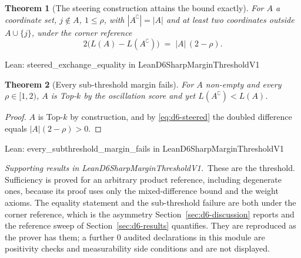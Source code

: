 \documentclass[conference]{IEEEtran}
\newtheorem{theorem}{Theorem}
\theoremstyle{definition}
\newcommand{\lean}[1]{\textsf{\footnotesize #1}}
\newcommand{\leanbox}[1]{%
  \par\vspace{2pt}\noindent
  {\footnotesize\textsf{Lean: #1}}\par\vspace{2pt}}
\begin{document}
\begin{theorem}[The steering construction attains the bound exactly]
\label{thm:d6-steered}
For $A$ a coordinate set, $j\notin A$, $1\le\rho$, with $|A^{\complement}|=|A|$ and at least
two coordinates outside $A\cup\{j\}$, under the corner reference
\begin{equation}
2\bigl(L(A)-L(A^{\complement})\bigr)\;=\;|A|\,(2-\rho).
\label{eq:d6-steered}
\end{equation}
\end{theorem}

\leanbox{\lean{steered\_exchange\_equality} in \lean{LeanD6SharpMarginThresholdV1}}

\begin{theorem}[Every sub-threshold margin fails]
\label{thm:d6-subthreshold}
For $A$ non-empty and every $\rho\in[1,2)$, $A$ is Top-$k$ by the oscillation score and yet
$L(A^{\complement})<L(A)$.
\end{theorem}

\begin{proof}
$A$ is Top-$k$ by construction, and by \eqref{eq:d6-steered} the doubled difference equals
$|A|(2-\rho)>0$.
\end{proof}

\leanbox{\lean{every\_subthreshold\_margin\_fails} in
\lean{LeanD6SharpMarginThresholdV1}}

\noindent\emph{Supporting results in \lean{LeanD6SharpMarginThresholdV1}.}~These are the threshold. Sufficiency is proved for an arbitrary product reference, including degenerate ones, because its proof uses only the mixed-difference bound and the weight axioms. The equality statement and the sub-threshold failure are both under the corner reference, which is the asymmetry Section~\ref{sec:d6-discussion} reports and the reference sweep of Section~\ref{sec:d6-results} quantifies. They are reproduced as the prover has them; a further $0$ audited declarations in this module are positivity checks and measurability side conditions and are not displayed.
\end{document}
